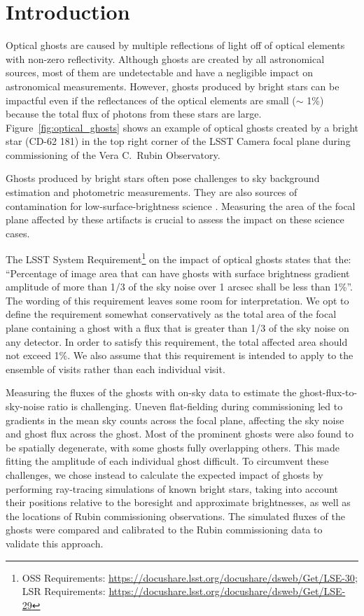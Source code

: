 \section{Introduction}
\label{sec:intro}
Optical ghosts are caused by multiple reflections of light off of optical elements with non-zero reflectivity. Although ghosts are created by all astronomical sources, most of them are undetectable and have a negligible impact on astronomical measurements. However, ghosts produced by bright stars can be impactful even if the reflectances of the optical elements are small ($\sim$ 1\%) because the total flux of photons from these stars are large. Figure~\ref{fig:optical_ghosts} shows an example of optical ghosts created by a bright star (CD-62 181) in the top right corner of the LSST Camera focal plane during commissioning of the Vera C.\ Rubin Observatory. 

Ghosts produced by bright stars often pose challenges to sky background estimation and photometric measurements. They are also sources of contamination for low-surface-brightness science \citep[e.g.,][]{Tanoglidis:2021,Tanoglidis:2022}. Measuring the area of the focal plane affected by these artifacts is crucial to assess the impact on these science cases.

The LSST System Requirement\footnote{OSS Requirements: \url{https://docushare.lsst.org/docushare/dsweb/Get/LSE-30};  LSR Requirements: \url{https://docushare.lsst.org/docushare/dsweb/Get/LSE-29} } on the impact of optical ghosts states that the: ``Percentage of image area that can have ghosts with surface brightness gradient amplitude of more than 1/3 of the sky noise over 1 arcsec shall be less than 1\%''. 
The wording of this requirement leaves some room for interpretation. We opt to define the requirement somewhat conservatively as the total area of the focal plane containing a ghost with a flux that is greater than 1/3 of the sky noise on any detector. In order to satisfy this requirement, the total affected area should not exceed 1\%. We also assume that this requirement is intended to apply to the ensemble of visits rather than each individual visit.

Measuring the fluxes of the ghosts with on-sky data to estimate the ghost-flux-to-sky-noise ratio is challenging. Uneven flat-fielding during commissioning led to gradients in the mean sky counts across the focal plane, affecting the sky noise and ghost flux across the ghost. Most of the prominent ghosts were also found to be spatially degenerate, with some ghosts fully overlapping others. This made fitting the amplitude of each individual ghost difficult. To circumvent these challenges, we chose instead to calculate the expected impact of ghosts by performing ray-tracing simulations of known bright stars, taking into account their positions relative to the boresight and approximate brightnesses, as well as the locations of Rubin commissioning observations. The simulated fluxes of the ghosts were compared and calibrated to the Rubin commissioning data to validate this approach.

